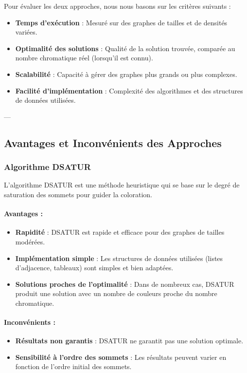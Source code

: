 \documentclass[11pt]{article}
\begin{document}
Pour évaluer les deux approches, nous nous basons sur les critères suivants :
\begin{itemize}
    \item \textbf{Temps d'exécution} : Mesuré sur des graphes de tailles et de densités variées.
    \item \textbf{Optimalité des solutions} : Qualité de la solution trouvée, comparée au nombre chromatique réel (lorsqu'il est connu).
    \item \textbf{Scalabilité} : Capacité à gérer des graphes plus grands ou plus complexes.
    \item \textbf{Facilité d'implémentation} : Complexité des algorithmes et des structures de données utilisées.
\end{itemize}

---

\subsection{Avantages et Inconvénients des Approches}

\subsubsection{Algorithme DSATUR}

L'algorithme DSATUR est une méthode heuristique qui se base sur le degré de saturation des sommets pour guider la coloration.

\paragraph{Avantages :}
\begin{itemize}
    \item \textbf{Rapidité} : DSATUR est rapide et efficace pour des graphes de tailles modérées.
    \item \textbf{Implémentation simple} : Les structures de données utilisées (listes d'adjacence, tableaux) sont simples et bien adaptées.
    \item \textbf{Solutions proches de l'optimalité} : Dans de nombreux cas, DSATUR produit une solution avec un nombre de couleurs proche du nombre chromatique.
\end{itemize}

\paragraph{Inconvénients :}
\begin{itemize}
    \item \textbf{Résultats non garantis} : DSATUR ne garantit pas une solution optimale.
    \item \textbf{Sensibilité à l'ordre des sommets} : Les résultats peuvent varier en fonction de l'ordre initial des sommets.
\end{itemize}
\end{document}

